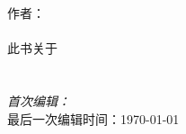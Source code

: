 \begin{titlepage}
  \raggedleft
  {\Large 作者：\\ \pdfauthor\\[1in]}    
  {\large 此书关于\\}
  {\Huge\scshape \bookname\\[.2in]}      
  {\large \bookoneword\\}    
  \vfill
  {\itshape 首次编辑：\timeandcompany\\}
  最后一次编辑时间：\today
\end{titlepage}